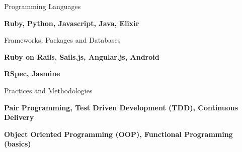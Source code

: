 \begin{cventries}
  \cventry
    {Programming Languages}
    {}
    {}
    {}
    {
      \begin{cvitems}
        \item {\textbf{Ruby, Python, Javascript, Java, Elixir}}
      \end{cvitems}
    }
  \cventry
    {Frameworks, Packages and Databases}
    {}
    {}
    {}
    {
      \begin{cvitems}
        \item {\textbf{Ruby on Rails, Sails.js, Angular.js, Android}}
        \item {\textbf{RSpec, Jasmine}}
      \end{cvitems}
    }
  \cventry
    {Practices and Methodologies}
    {}
    {}
    {}
    {
      \begin{cvitems}
        \item {\textbf{Pair Programming, Test Driven Development (TDD), Continuous Delivery}}
        \item {\textbf{Object Oriented Programming (OOP), Functional Programming (basics)}}
      \end{cvitems}
    }
\end{cventries}
